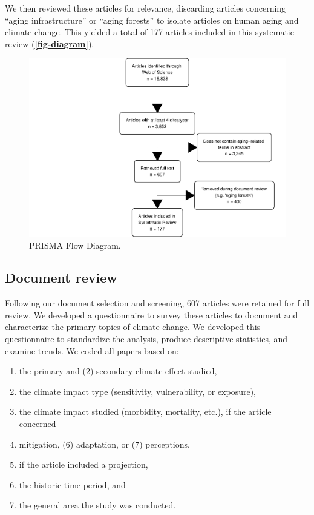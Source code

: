 \documentclass[12pt]{article}
\providecommand{\tightlist}{%
  \setlength{\itemsep}{0pt}\setlength{\parskip}{0pt}}
\begin{document}
We then reviewed these articles for relevance, discarding articles
concerning ``aging infrastructure'' or ``aging forests'' to isolate
articles on human aging and climate change. This yielded a total of 177
articles included in this systematic review
(\textbf{\autoref{fig-diagram}}).

\begin{figure}
\centering
\includegraphics{MainDocument_files/figure-latex/figureflowdiagram-1.pdf}
\caption{PRISMA Flow Diagram. \label{fig-diagram}}
\end{figure}

\hypertarget{document-review}{%
\subsection{Document review}\label{document-review}}

Following our document selection and screening, 607 articles were
retained for full review. We developed a questionnaire to survey these
articles to document and characterize the primary topics of climate
change. We developed this questionnaire to standardize the analysis,
produce descriptive statistics, and examine trends. We coded all papers
based on:

\begin{enumerate}
\def\labelenumi{(\arabic{enumi})}
\tightlist
\item
  the primary and (2) secondary climate effect studied,
\item
  the climate impact type (sensitivity, vulnerability, or exposure),
\item
  the climate impact studied (morbidity, mortality, etc.), if the
  article concerned
\item
  mitigation, (6) adaptation, or (7) perceptions,
\item
  if the article included a projection,
\item
  the historic time period, and
\item
  the general area the study was conducted.
\end{enumerate}
\end{document}
